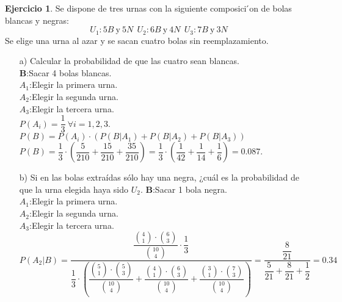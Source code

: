 \documentclass[a4paper, 12pt]{article}
\theoremstyle{definition}
\newtheorem{ej}{Ejercicio}
\begin{document}
\begin{ej}
Se dispone de tres urnas con la siguiente composici ́on de bolas blancas y negras:
$$U_1: 5B \ \text{y} \ 5N \ \ U_2: 6B \ \text{y} \ 4N \ \ U_3: 7B \ \text{y} \ 3N$$
Se elige una urna al azar y se sacan cuatro bolas sin reemplazamiento.
\begin{enumerate}
    \item[a) ] Calcular la probabilidad de que las cuatro sean blancas.\\
    \textbf{B}:Sacar 4 bolas blancas. \\
    \textbf{$A_1$}:Elegir la primera urna. \\
    \textbf{$A_2$}:Elegir la segunda urna. \\
    \textbf{$A_3$}:Elegir la tercera urna. \\
    $P(A_i) = \dfrac{1}{3} \ \forall i=1,2,3. $
    $P(B) = P(A_i)\cdot (P(B|A_1) + P(B|A_2) + P(B|A_3))$
    $P(B) = \dfrac{1}{3}\cdot (\dfrac{5}{210} + \dfrac{15}{210} + \dfrac{35}{210}) = \dfrac{1}{3}\cdot (\dfrac{1}{42} + \dfrac{1}{14} + \dfrac{1}{6}) = 0.087.$
    \item[b) ] Si en las bolas extraídas sólo hay una negra, ¿cuál es la probabilidad de que la urna elegida haya sido $U_2$.
    \textbf{B}:Sacar 1 bola negra. \\
    \textbf{$A_1$}:Elegir la primera urna. \\
    \textbf{$A_2$}:Elegir la segunda urna. \\
    \textbf{$A_3$}:Elegir la tercera urna. \\
    $P(A_2|B) = \dfrac{\dfrac{{4 \choose 1} \cdot {6 \choose 3}}{{10 \choose 4}} \cdot \dfrac{1}{3}}{\dfrac{1}{3} \cdot ( \dfrac{{5 \choose 1} \cdot {5 \choose 3}}{{10 \choose 4}} + \dfrac{{4 \choose 1} \cdot {6 \choose 3}}{{10 \choose 4}} + \dfrac{{3 \choose 1} \cdot {7 \choose 3}}{{10 \choose 4}})} = \dfrac{\dfrac{8}{21}}{\dfrac{5}{21} + \dfrac{8}{21} + \dfrac{1}{2}} = 0.34$
\end{enumerate}
\end{ej}
\end{document}
